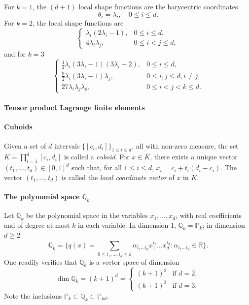 For $k=1$, the $(d+1)$ local shape functions are the barycentric coordinates
\begin{equation}
    \theta_i = \lambda_i, \quad 0 \le i \le d.
\end{equation}
For $k=2$, the local shape functions are
\begin{equation}
    \begin{cases} \lambda_i(2\lambda_i - 1), & 0 \le i \le d, \\ 4\lambda_i \lambda_j, & 0 \le i < j \le d, \end{cases}
\end{equation}
and for $k=3$
\begin{equation}
    \begin{cases} \frac{1}{2}\lambda_i(3\lambda_i - 1)(3\lambda_i - 2), & 0 \le i \le d, \\ \frac{9}{2}\lambda_i(3\lambda_i - 1)\lambda_j, & 0 \le i,j \le d, i \ne j, \\ 27\lambda_i \lambda_j \lambda_k, & 0 \le i < j < k \le d. \end{cases}
\end{equation}
\paragraph{Tensor product Lagrange finite elements}
\paragraph{Cuboids} Given a set of $d$ intervals $\{[c_i, d_i]\}_{1 \le i \le d}$, all with non-zero measure, the set $K = \prod_{i=1}^d [c_i, d_i]$ is called a \emph{cuboid}. For $x \in K$, there exists a unique vector $(t_1, \dots, t_d) \in [0, 1]^d$ such that, for all $1 \le i \le d$, $x_i = c_i + t_i(d_i - c_i)$. The vector $(t_1, \dots, t_d)$ is called the \emph{local coordinate vector} of $x$ in $K$.

\paragraph{\texorpdfstring{The polynomial space $\mathbb{Q}_k$}{The polynomial space Qk}} Let $\mathbb{Q}_k$ be the polynomial space in the variables $x_1, \dots, x_d$, with real coefficients and of degree at most $k$ in each variable. In dimension 1, $\mathbb{Q}_k = \mathbb{P}_k$; in dimension $d \ge 2$
\begin{equation}
    \mathbb{Q}_k = \{ q(x) = \sum_{0 \le i_1, \dots, i_d \le k} \alpha_{i_1 \dots i_d} x_1^{i_1} \dots x_d^{i_d} : \alpha_{i_1 \dots i_d} \in \mathbb{R} \}.
\end{equation}
One readily verifies that $\mathbb{Q}_k$ is a vector space of dimension
\begin{equation}
    \dim \mathbb{Q}_k = (k+1)^d = \begin{cases} (k+1)^2 & \text{if } d=2, \\ (k+1)^3 & \text{if } d=3. \end{cases}
\end{equation}
Note the inclusions $\mathbb{P}_k \subset \mathbb{Q}_k \subset \mathbb{P}_{kd}$.

